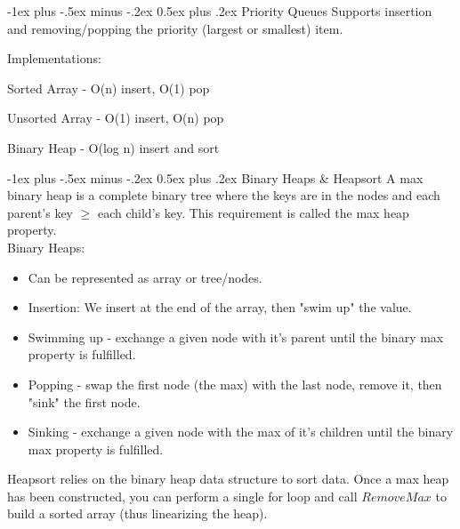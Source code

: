 \documentclass[letterpaper, 8pt]{extarticle}
\makeatletter
\renewcommand{\section}{\@startsection{section}{1}{0mm}%
                                {-1ex plus -.5ex minus -.2ex}%
                                {0.5ex plus .2ex}%
                                {\normalfont\normalsize\bfseries}}
\makeatother
\begin{document}
\begin{multicols*}{4}
    \section{Priority Queues}
    Supports insertion and removing/popping the priority (largest or smallest) item.

    Implementations:
    \begin{list}{}{}
        \item Sorted Array - O(n) insert, O(1) pop
        \item Unsorted Array - O(1) insert, O(n) pop
        \item Binary Heap - O(log n) insert and sort
    \end{list}

    \section{Binary Heaps \& Heapsort}
    A max binary heap is a complete binary tree where the keys are in the nodes and each parent's key $\geq$ each child's key. This requirement is called the max heap property.
    \\
    Binary Heaps:
    \begin{itemize}
        \item Can be represented as array or tree/nodes.
        \item Insertion: We insert at the end of the array, then "swim up" the value.
        \item Swimming up - exchange a given node with it's parent until the binary max property is fulfilled.
        \item Popping - swap the first node (the max) with the last node, remove it, then "sink" the first node.
        \item Sinking - exchange a given node with the max of it's children until the binary max property is fulfilled.
    \end{itemize}

    Heapsort relies on the binary heap data structure to sort data. Once a max heap has been constructed, you can perform a single for loop and call $RemoveMax$ to build a sorted array (thus linearizing the heap).

\end{multicols*}
\end{document}
